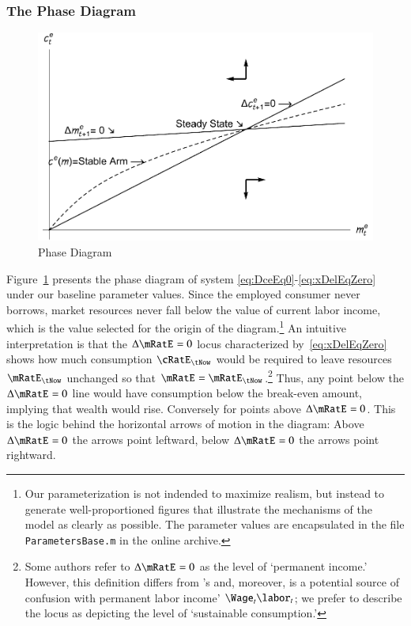 \documentclass[titlepage,abstract]{\econtex}\newcommand{\texname}{ctDiscrete}
\begin{document}
\subsubsection{The Phase Diagram \label{sec:phase} }
\begin{figure}
\caption{Phase Diagram}\label{fig:PhaseDiag}
\includegraphics{./Figures/TractableBufferStockPhaseDiag}
\end{figure}
Figure~\ref{fig:PhaseDiag} presents the phase diagram of system
\eqref{eq:DceEq0}-\eqref{eq:xDelEqZero} under our baseline parameter
values. Since the employed consumer never borrows, market resources never fall below the value of current labor income, which is the value selected for the origin of the diagram.\footnote{Our parameterization is not indended to maximize
  realism, but instead to generate well-proportioned figures that
  illustrate the mechanisms of the model as clearly as possible.  The
  parameter values are encapsulated in the file
  \texttt{ParametersBase.m} in the online archive.} 
An intuitive interpretation is that the $\Delta \mRatE_{\tSS} = 0$ locus
characterized by~\eqref{eq:xDelEqZero} shows how much consumption
$\cRatE_{\tNow}$ would be required to leave resources $\mRatE_{\tNow}$
unchanged so that $\mRatE_{\tSS}=\mRatE_{\tNow}$.\footnote{Some
  authors refer to $\Delta \mRatE_{\tSS} = 0$ as the level of
  `permanent income.' However, this definition differs from
  \cite{friedmanATheory}'s and, moreover, is a potential source of
  confusion with permanent labor income' $\Wage_{t} \labor_{t}$; we
  prefer to describe the locus as depicting the level of `sustainable
  consumption.'} 
Thus, any point below the $\Delta \mRatE_{\tSS}=0$
line would have consumption below the break-even amount, implying that
wealth would rise. Conversely for points above $\Delta
\mRatE_{\tSS}=0$. This is the logic behind the horizontal arrows of
motion in the diagram: Above $\Delta \mRatE_{\tSS}=0$ the arrows point
leftward, below $\Delta \mRatE_{\tSS}=0$ the arrows point rightward.
\end{document}
